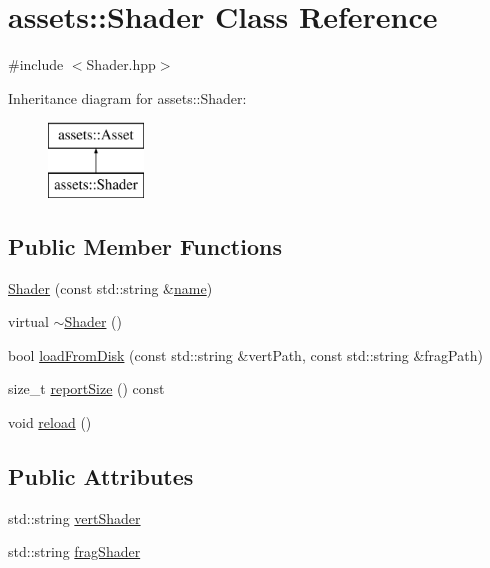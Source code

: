 \hypertarget{classassets_1_1Shader}{\section{assets\-:\-:Shader Class Reference}
\label{classassets_1_1Shader}
}


{\ttfamily \#include $<$Shader.\-hpp$>$}

Inheritance diagram for assets\-:\-:Shader\-:\begin{figure}[H]
\begin{center}
\leavevmode
\includegraphics[height=2.000000cm]{classassets_1_1Shader}
\end{center}
\end{figure}
\subsection*{Public Member Functions}
\begin{DoxyCompactItemize}
\item 
\hyperlink{classassets_1_1Shader_aa298749f693c8d9b667a7f5a0e39b1a3}{Shader} (const std\-::string \&\hyperlink{classassets_1_1Asset_a57fe90e1aa9281f2dd59041dffcc74b4}{name})
\item 
virtual \hyperlink{classassets_1_1Shader_a922ad157480d93bb9729f1062e3fd8ca}{$\sim$\-Shader} ()
\item 
bool \hyperlink{classassets_1_1Shader_ac1c91c19ff260af40805c0a9bf510e6a}{load\-From\-Disk} (const std\-::string \&vert\-Path, const std\-::string \&frag\-Path)
\item 
size\-\_\-t \hyperlink{classassets_1_1Shader_aa5d97004f3eb6185354c706afa85a10d}{report\-Size} () const 
\item 
void \hyperlink{classassets_1_1Shader_a17cc6b2e8252178735ad16bae5c8bf9b}{reload} ()
\end{DoxyCompactItemize}
\subsection*{Public Attributes}
\begin{DoxyCompactItemize}
\item 
std\-::string \hyperlink{classassets_1_1Shader_af085d461d2cffeaac347ec23c548b4eb}{vert\-Shader}
\item 
std\-::string \hyperlink{classassets_1_1Shader_aa3d8e72e6225f27aa36bcfc985e80807}{frag\-Shader}
\end{DoxyCompactItemize}
